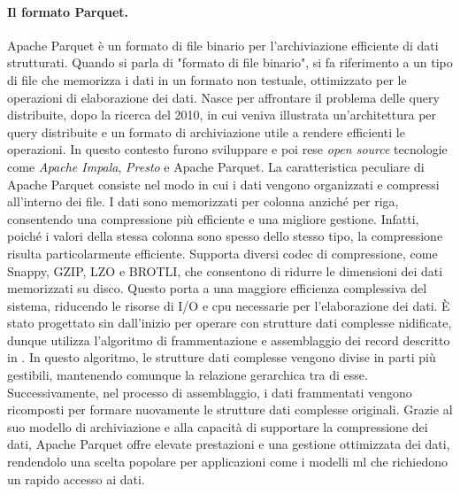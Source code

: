 \documentclass[12pt,a4paper,fleqn,titlepage]{report}
\begin{document}
        \paragraph{Il formato Parquet.}
        Apache Parquet è un formato di file binario per l'archiviazione efficiente di dati strutturati. Quando si parla di "formato di file binario", si fa riferimento a un tipo di file che memorizza i dati in un formato non testuale, ottimizzato per le operazioni di elaborazione dei dati.
        Nasce per affrontare il problema delle query distribuite, dopo la ricerca \cite{melnik:2010} del 2010, in cui veniva illustrata un'architettura per query distribuite e un formato di archiviazione utile a rendere efficienti le operazioni. In questo contesto furono sviluppare e poi rese \textit{open source} tecnologie come \emph{Apache Impala}, \emph{Presto} e Apache Parquet.
        La caratteristica peculiare di Apache Parquet consiste nel modo in cui i dati vengono organizzati e compressi all'interno dei file. I dati sono memorizzati per colonna anziché per riga, consentendo una compressione più efficiente e una migliore gestione. Infatti, poiché i valori della stessa colonna sono spesso dello stesso tipo, la compressione risulta particolarmente efficiente.
        Supporta diversi codec di compressione, come Snappy, GZIP, LZO e BROTLI, che consentono di ridurre le dimensioni dei dati memorizzati su disco. Questo porta a una maggiore efficienza complessiva del sistema, riducendo le risorse di I/O e \gls{cpu} necessarie per l'elaborazione dei dati. È stato progettato sin dall'inizio per operare con strutture dati complesse nidificate, dunque utilizza l'algoritmo di frammentazione e assemblaggio dei record descritto in \cite{melnik:2010}. In questo algoritmo, le strutture dati complesse vengono divise in parti più gestibili, mantenendo comunque la relazione gerarchica tra di esse. Successivamente, nel processo di assemblaggio, i dati frammentati vengono ricomposti per formare nuovamente le strutture dati complesse originali.
        Grazie al suo modello di archiviazione e alla capacità di supportare la compressione dei dati, Apache Parquet offre elevate prestazioni e una gestione ottimizzata dei dati, rendendolo una scelta popolare per applicazioni come i modelli \gls{ml} che richiedono un rapido accesso ai dati.
\end{document}
